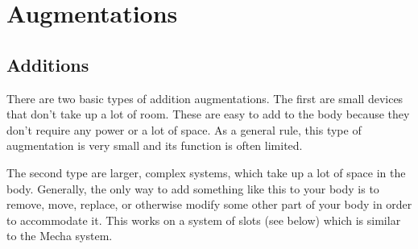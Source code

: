 \documentclass[twoside]{book}
\begin{document}
\begin{multicols}{2}
    


\hspace{-2ex}
\vspace{1ex}


    


\hspace{-2ex}
\vspace{1ex}


    


\hspace{-2ex}
\vspace{1ex}


    
\end{multicols}
  
    

\chapter{Augmentations}
    
    

\section{Additions}
    
    {  
    There are two basic types of addition augmentations. The first are small devices that don't take up a lot of room. These are easy to add to the body because they don't require any power or a lot of space. As a general rule, this type of augmentation is very small and its function is often limited.
    }
  
    {  
    The second type are larger, complex systems, which take up a lot of space in the body. Generally, the only way to add something like this to your body is to remove, move, replace, or otherwise modify some other part of your body in order to accommodate it. This works on a system of slots (see below) which is similar to the Mecha system.
    }
  
\end{document}
